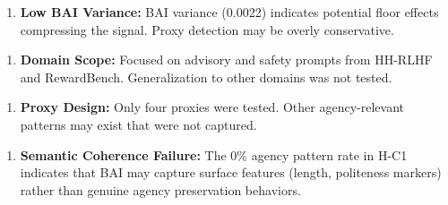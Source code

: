 \begin{enumerate}
\item \textbf{Low BAI Variance:} BAI variance (0.0022) indicates potential floor effects compressing the signal. Proxy detection may be overly conservative.
\end{enumerate}

\begin{enumerate}
\item \textbf{Domain Scope:} Focused on advisory and safety prompts from HH-RLHF and RewardBench. Generalization to other domains was not tested.
\end{enumerate}

\begin{enumerate}
\item \textbf{Proxy Design:} Only four proxies were tested. Other agency-relevant patterns may exist that were not captured.
\end{enumerate}

\begin{enumerate}
\item \textbf{Semantic Coherence Failure:} The 0\% agency pattern rate in H-C1 indicates that BAI may capture surface features (length, politeness markers) rather than genuine agency preservation behaviors.
\end{enumerate}
